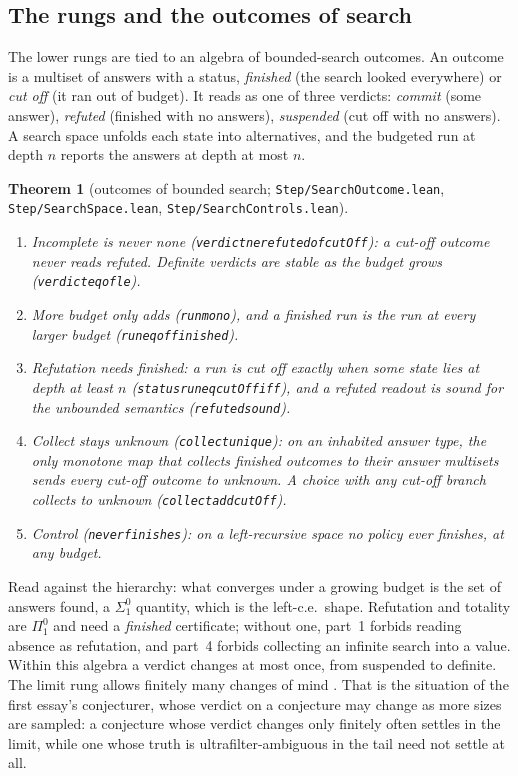\documentclass[]{article}
\newtheorem{theorem}{Theorem}
\theoremstyle{definition}
\theoremstyle{remark}
\newcommand{\codeus}{\textunderscore\allowbreak}
\newcommand{\code}[1]{\texttt{\let\_\codeus #1}}
\newcommand{\lpath}[1]{{\ttfamily\nolinkurl{#1}}}
\newcommand{\step}[1]{\lpath{Step/#1.lean}}
\begin{document}
\subsection{The rungs and the outcomes of search}
\label{sec:hier-search}

The lower rungs are tied to an algebra of bounded-search outcomes. An outcome is a multiset of
answers with a status, \emph{finished} (the search looked everywhere) or \emph{cut off} (it ran out of
budget). It reads as one of three verdicts: \emph{commit} (some answer), \emph{refuted} (finished with
no answers), \emph{suspended} (cut off with no answers). A search space unfolds each state into
alternatives, and the budgeted run at depth $n$ reports the answers at depth at most $n$.

\begin{theorem}[outcomes of bounded search; \step{SearchOutcome}, \step{SearchSpace}, \step{SearchControls}]
\label{thm:search}
\leavevmode
\begin{enumerate}
\item \emph{Incomplete is never none} (\code{verdict\_ne\_refuted\_of\_cutOff}): a cut-off outcome never
  reads refuted. Definite verdicts are stable as the budget grows (\code{verdict\_eq\_of\_le}).
\item \emph{More budget only adds} (\code{run\_mono}), and a finished run is the run at every larger
  budget (\code{run\_eq\_of\_finished}).
\item \emph{Refutation needs finished}: a run is cut off exactly when some state lies at depth at
  least $n$ (\code{status\_run\_eq\_cutOff\_iff}), and a refuted readout is sound for the unbounded
  semantics (\code{refuted\_sound}).
\item \emph{Collect stays unknown} (\code{collect\_unique}): on an inhabited answer type, the only
  monotone map that collects finished outcomes to their answer multisets sends every cut-off outcome
  to \emph{unknown}. A choice with any cut-off branch collects to unknown
  (\code{collect\_add\_cutOff}).
\item \emph{Control} (\code{never\_finishes}): on a left-recursive space no policy ever finishes, at
  any budget.
\end{enumerate}
\end{theorem}

Read against the hierarchy: what converges under a growing budget is the set of answers found, a
$\Sigma^0_1$ quantity, which is the left-c.e.\ shape. Refutation and totality are $\Pi^0_1$ and need a
\emph{finished} certificate; without one, part~1 forbids reading absence as refutation, and part~4
forbids collecting an infinite search into a value. Within this algebra a verdict changes at most
once, from suspended to definite. The limit rung allows finitely many changes of mind
\cite{Gold1965, Putnam1965}. That is the situation of the first essay's conjecturer, whose verdict on
a conjecture may change as more sizes are sampled: a conjecture whose verdict changes only finitely
often settles in the limit, while one whose truth is ultrafilter-ambiguous in the tail need not
settle at all.
\end{document}
